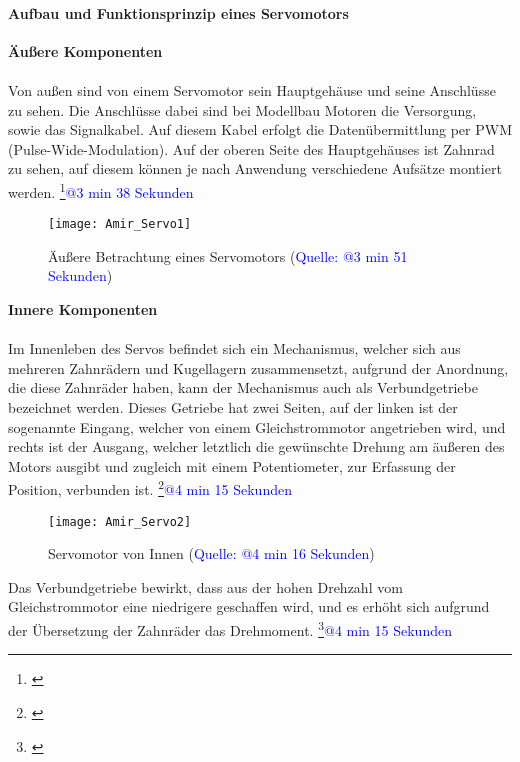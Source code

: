 \documentclass[titlepage,12pt,twoside]{article}
\begin{document}
\paragraph{Aufbau und Funktionsprinzip eines Servomotors}
\label{par:Aufbau und Funktionsprinzip eines Servomotors}
\hfill \break
\hfill \break
\textbf{Äußere Komponenten} \\
\\
Von außen sind von einem Servomotor sein Hauptgehäuse und seine 
Anschlüsse zu sehen. Die Anschlüsse dabei sind bei Modellbau Motoren 
die Versorgung, sowie das Signalkabel. Auf diesem Kabel erfolgt die 
Datenübermittlung per PWM (Pulse-Wide-Modulation). Auf der oberen Seite 
des Hauptgehäuses ist Zahnrad zu sehen, auf diesem können je nach 
Anwendung verschiedene Aufsätze montiert werden. \footnote{\cite{Q1}}\textcolor{blue}{@3 min 38 Sekunden} \\
\begin{figure}[H]
	\begin{center}
		\scalebox{1.2}
		{\texttt{[image: Amir\_Servo1]}}
		\caption{Äußere Betrachtung eines Servomotors (\textcolor{blue}{Quelle: \cite{Q8}@3 min 51 Sekunden})}
		\label{fig:Amir_Servo1}
	\end{center}
\end{figure}
\hfill \break
\textbf{Innere Komponenten} \\
\\
Im Innenleben des Servos befindet sich ein Mechanismus, welcher sich aus 
mehreren Zahnrädern und Kugellagern zusammensetzt, aufgrund der 
Anordnung, die diese Zahnräder haben, kann der Mechanismus auch als 
Verbundgetriebe bezeichnet werden. Dieses Getriebe hat zwei Seiten, auf 
der linken ist der sogenannte Eingang, welcher von einem Gleichstrommotor 
angetrieben wird, und rechts ist der Ausgang, welcher letztlich die 
gewünschte Drehung am äußeren des Motors ausgibt und zugleich mit einem 
Potentiometer, zur Erfassung der Position, verbunden ist. \footnote{\cite{Q8}}\textcolor{blue}{@4 min 15 Sekunden} \\
\begin{figure}[H]
	\begin{center}
		\scalebox{1.2}
		{\texttt{[image: Amir\_Servo2]}}
		\caption{Servomotor von Innen (\textcolor{blue}{Quelle: \cite{Q8}@4 min 16 Sekunden})}
		\label{fig:Amir_Servo2}
	\end{center}
\end{figure}
\hfill \break
Das Verbundgetriebe bewirkt, dass aus der hohen Drehzahl vom 
Gleichstrommotor eine niedrigere geschaffen wird, und es erhöht sich 
aufgrund der Übersetzung der Zahnräder das Drehmoment. \footnote{\cite{Q8}}\textcolor{blue}{@4 min 15 Sekunden} \\
\end{document}
